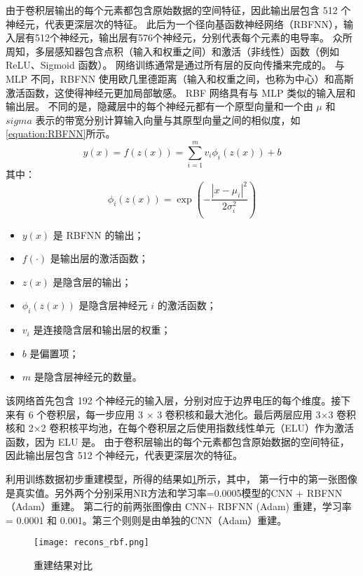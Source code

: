 由于卷积层输出的每个元素都包含原始数据的空间特征，因此输出层包含 512 个神经元，代表更深层次的特征。
此后为一个径向基函数神经网络（RBFNN），输入层有512个神经元，输出层有576个神经元，分别代表每个元素的电导率。
众所周知，多层感知器包含点积（输入和权重之间）和激活（非线性）函数（例如 ReLU、Sigmoid 函数）。
网络训练通常是通过所有层的反向传播来完成的。
与 MLP 不同，RBFNN 使用欧几里德距离（输入和权重之间，也称为中心）和高斯激活函数，这使得神经元更加局部敏感。 
RBF 网络具有与 MLP 类似的输入层和输出层。
不同的是，隐藏层中的每个神经元都有一个原型向量和一个由 $\mu$ 和 $sigma$ 表示的带宽分别计算输入向量与其原型向量之间的相似度，如\cref{equation:RBFNN}所示。
\begin{equation}
    \label{equation:RBFNN}
    y(x) = f(z(x)) = \sum_{i=1}^{m} v_i \phi_i(z(x)) + b
\end{equation}
其中：
\begin{equation}
    \phi_i(z(x)) = \exp\left(-\frac{|x - \mu_i|^2}{2\sigma_i^2}\right)
\end{equation}

\begin{itemize}
    \item $y(x)$ 是 RBFNN 的输出；
    \item $f(\cdot)$ 是输出层的激活函数；
    \item $z(x)$ 是隐含层的输出；
    \item $\phi_i(z(x))$ 是隐含层神经元 $i$ 的激活函数；
    \item $v_i$ 是连接隐含层和输出层的权重；
    \item $b$ 是偏置项；
    \item $m$ 是隐含层神经元的数量。
\end{itemize}



该网络首先包含 192 个神经元的输入层，分别对应于边界电压的每个维度。接下来有 6 个卷积层，每一步应用 3 × 3 卷积核和最大池化。最后两层应用 3×3 卷积核和 2×2 卷积核平均池，在每个卷积层之后使用指数线性单元（ELU）作为激活函数，因为 ELU 是。
由于卷积层输出的每个元素都包含原始数据的空间特征，因此输出层包含 512 个神经元，代表更深层次的特征。

利用训练数据初步重建模型，所得的结果如\cref{figure:recons_rbf}所示，其中，
第一行中的第一张图像是真实值。另外两个分别采用NR方法和学习率=0.0005模型的CNN + RBFNN（Adam）重建。
第二行的前两张图像由 CNN+ RBFNN (Adam) 重建，学习率 = 0.0001 和 0.001。第三个则则是由单独的CNN（Adam）重建。
\begin{figure}[H]
    \centering
    
    \texttt{[image: recons\_rbf.png]}
    \label{figure:recons_rbf}
    \caption{重建结果对比}
\end{figure}

